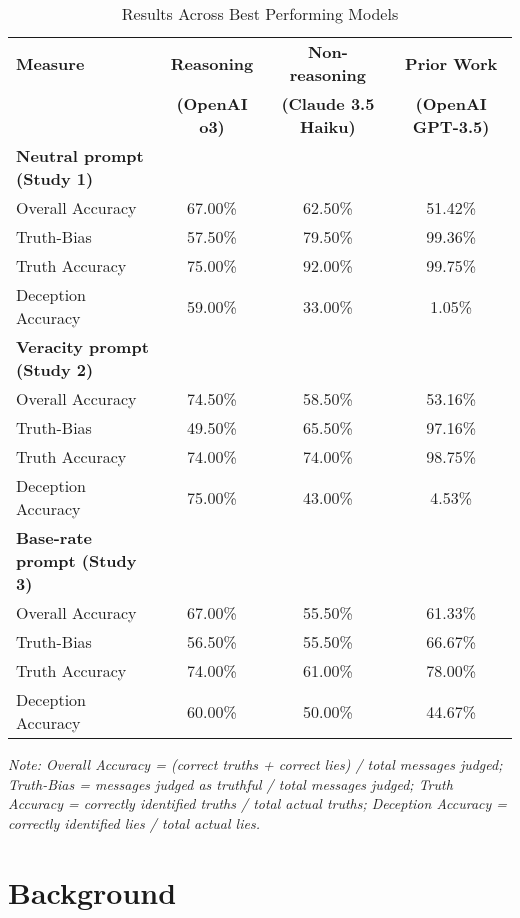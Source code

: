 \documentclass{article}
\begin{document}
\begin{table}[ht]
\centering
\caption{Results Across Best Performing Models}
\begin{tabular}{lccc}
\toprule
\textbf{Measure} & \textbf{Reasoning} & \textbf{Non-reasoning} & \textbf{Prior Work} \citep{markowitz_generative_2024} \\
 & \textbf{(OpenAI o3)} & \textbf{(Claude 3.5 Haiku)} & \textbf{(OpenAI GPT-3.5)} \\
\midrule
\textbf{Neutral prompt (Study 1)} & & & \\
Overall Accuracy & 67.00\% & 62.50\% & 51.42\% \\
Truth-Bias & 57.50\% & 79.50\% & 99.36\% \\
Truth Accuracy & 75.00\% & 92.00\% & 99.75\% \\
Deception Accuracy & 59.00\% & 33.00\% & 1.05\% \\
\midrule
\textbf{Veracity prompt (Study 2)} & & & \\
Overall Accuracy & 74.50\% & 58.50\% & 53.16\% \\
Truth-Bias & 49.50\% & 65.50\% & 97.16\% \\
Truth Accuracy & 74.00\% & 74.00\% & 98.75\% \\
Deception Accuracy & 75.00\% & 43.00\% & 4.53\% \\
\midrule
\textbf{Base-rate prompt (Study 3)} & & & \\
Overall Accuracy & 67.00\% & 55.50\% & 61.33\% \\
Truth-Bias & 56.50\% & 55.50\% & 66.67\% \\
Truth Accuracy & 74.00\% & 61.00\% & 78.00\% \\
Deception Accuracy & 60.00\% & 50.00\% & 44.67\% \\
\bottomrule
\end{tabular}
\begin{minipage}{0.9\linewidth}
\vspace{0.05in}
\footnotesize
\textit{Note: Overall Accuracy = (correct truths + correct lies) / total messages judged; Truth-Bias = messages judged as truthful / total messages judged; Truth Accuracy = correctly identified truths / total actual truths; Deception Accuracy = correctly identified lies / total actual lies.}
\end{minipage}
\label{tab:results_across_models}
\end{table}

\section{Background}
\label{sec:background}
\end{document}
